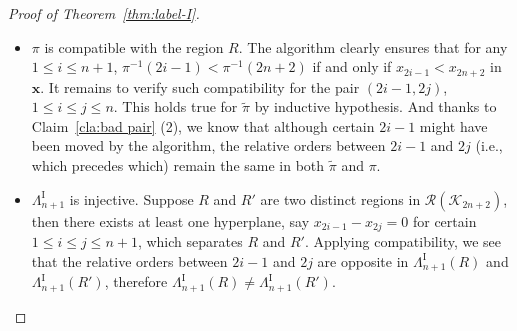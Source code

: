 \documentclass[11pt,reqno]{amsart}
\numberwithin{equation}{section}
\theoremstyle{plain}
\theoremstyle{definition}
\newcommand{\bx}{\mathbf{x}}
\newcommand{\cK}{\mathcal{K}}
\newcommand{\cR}{\mathcal{R}}
\newcommand{\LI}{\Lambda^{\mathrm{I}}}
\def\oE{\mathrm{oE}}
\begin{document}
\begin{proof}[Proof of Theorem~\ref{thm:label-I}]
\begin{itemize}
\begin{enumerate}
 			\item When $u=i_1\cdots i_m$ is inserted in step 3, say as $\cdots j i_1\cdots i_m l\cdots$, then $ji_1$ and $i_ml$ may form new ascents. For $ji_1$, it will be separated by the $y$ inserted in step 4\footnote{Notice that if steps 2 and 3 were executed, then the odd number $k$ in step 4 is precisely the number $j$ found in step 2.}. While for $i_ml$, by Claim~\ref{cla:bad pair} (1) we have $i_m>j$, so if $i_ml$ does form an ascent then $jl$ is already an ascent in $\tilde{\pi}$, which forces the ascent top $l$ to be even. We see indeed $i_ml$ is an $\oE$ ascent that is allowed.

 			\item When $y$ is inserted after $k$ in step 4, a new ascent may be formed between $k$ and $y$. But no matter $y=2n+2$ or $y=(2n+2)(2n+1)$, it must begin with the even number $2n+2$, so this new ascent $k(2n+2)$ is a legal $\oE$ ascent.
 		\end{enumerate}

 		\item $\pi$ is compatible with the region $R$. The algorithm clearly ensures that for any $1\le i\le n+1$, $\pi^{-1}(2i-1)<\pi^{-1}(2n+2)$ if and only if $x_{2i-1}<x_{2n+2}$ in $\bx$. It remains to verify such compatibility for the pair $(2i-1,2j)$, $1\le i\le j\le n$. This holds true for $\tilde{\pi}$ by inductive hypothesis. And thanks to Claim~\ref{cla:bad pair} (2), we know that although certain $2i-1$ might have been moved by the algorithm, the relative orders between $2i-1$ and $2j$ (i.e., which precedes which) remain the same in both $\tilde{\pi}$ and $\pi$.

 		\item $\LI_{n+1}$ is injective. Suppose $R$ and $R'$ are two distinct regions in $\cR(\cK_{2n+2})$, then there exists at least one hyperplane, say $x_{2i-1}-x_{2j}=0$ for certain $1\le i\le j\le n+1$, which separates $R$ and $R'$. Applying compatibility, we see that the relative orders between $2i-1$ and $2j$ are opposite in $\LI_{n+1}(R)$ and $\LI_{n+1}(R')$, therefore $\LI_{n+1}(R)\neq \LI_{n+1}(R')$.
 		

\end{itemize}
\end{proof}
\end{document}
